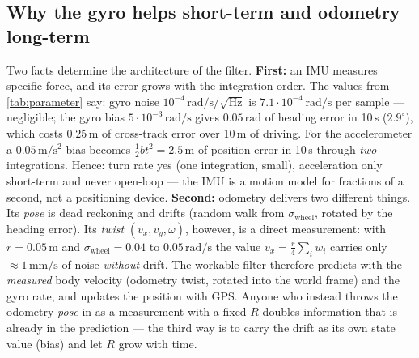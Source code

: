 \documentclass[12pt,a4paper]{scrartcl}
\begin{document}
\subsection{Why the gyro helps short-term and odometry long-term}
Two facts determine the architecture of the filter. \textbf{First:} an IMU measures
specific force, and its error grows with the integration order. The values from
\cref{tab:parameter} say: gyro noise \(10^{-4}\,\mathrm{rad/s/\sqrt{Hz}}\) is
\(7.1\cdot10^{-4}\,\mathrm{rad/s}\) per sample — negligible; the gyro bias
\(5\cdot10^{-3}\,\mathrm{rad/s}\) gives \(0.05\,\mathrm{rad}\) of heading error in
10\,s (\(2.9^{\circ}\)), which costs \(0.25\,\mathrm{m}\) of cross-track error over
10\,m of driving. For the accelerometer a \(0.05\,\mathrm{m/s^2}\) bias becomes
\(\tfrac12 b t^2 = 2.5\,\mathrm{m}\) of position error in 10\,s through
\emph{two} integrations. Hence: turn rate yes (one integration, small), acceleration only
short-term and never open-loop — the IMU is a motion model for fractions of a second,
not a positioning device. \textbf{Second:} odometry delivers two different things. Its
\emph{pose} is dead reckoning and drifts (random walk from \(\sigma_\text{wheel}\),
rotated by the heading error). Its \emph{twist} \((v_x,v_y,\omega)\), however, is a
direct measurement: with \(r=0.05\,\mathrm{m}\) and \(\sigma_\text{wheel}=0.04\) to
\(0.05\,\mathrm{rad/s}\) the value \(v_x=\tfrac{r}{4}\sum_i w_i\) carries only
\(\approx 1\,\mathrm{mm/s}\) of noise \emph{without} drift. The workable filter therefore
predicts with the \emph{measured} body velocity (odometry twist, rotated into the world
frame) and the gyro rate, and updates the position with GPS. Anyone who instead throws the
odometry \emph{pose} in as a measurement with a fixed \(R\) doubles information that is
already in the prediction — the third way is to carry the drift as its own state
value (bias) and let \(R\) grow with time.
\end{document}
